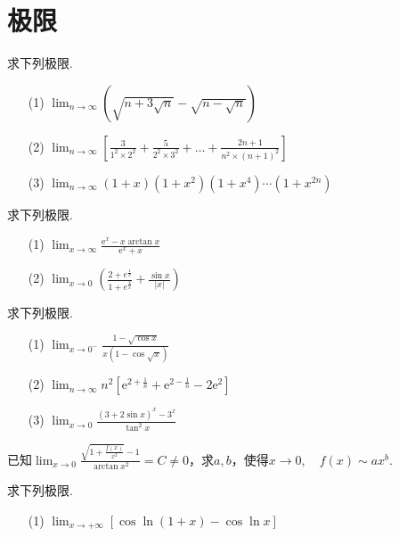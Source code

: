 \section{极限}
\begin{xiti}
\item 求下列极限.
\begin{enumerate}
	\item[(1)] $\lim _ { n \rightarrow \infty } ( \sqrt { n + 3 \sqrt { n } } - \sqrt { n - \sqrt { n } } )$
	\item[(2)] $\lim _ { n \rightarrow \infty } \left[ \frac { 3 } { 1 ^ { 2 } \times 2 ^ { 2 } } + \frac { 5 } { 2 ^ { 2 } \times 3 ^ { 2 } } + \dots + \frac { 2 n + 1 } { n ^ { 2 } \times ( n + 1 ) ^ { 2 } } \right]$
	\item[(3)] $\lim _ { n \rightarrow \infty } ( 1 + x ) \left( 1 + x ^ { 2 } \right) \left( 1 + x ^ { 4 } \right) \cdots \left( 1 + x ^ { 2 n } \right)$
\end{enumerate}
\item 求下列极限.
\begin{enumerate}
	\item[(1)] $\lim _ { x \rightarrow \infty } \frac { \mathrm { e } ^ { x } - x \arctan x } { \mathrm { e } ^ { x } + x }$
	\item[(2)] $\lim _ { x \rightarrow 0 } \left( \frac { 2 + e ^ { \frac { 1 } { x } } } { 1 + e ^ { \frac { 4 } { x } } } + \frac { \sin x } { | x | } \right)$
\end{enumerate}
\item 求下列极限.
\begin{enumerate}
	\item[(1)] $\lim _ { x \rightarrow 0 ^ { - } } \frac { 1 - \sqrt { \cos x } } { x ( 1 - \cos \sqrt { x } ) }$
	\item[(2)] $\lim _ { n \rightarrow \infty } n ^ { 2 } \left[ \mathrm { e } ^ { 2 + \frac { 1 } { n } } + \mathrm { e } ^ { 2 - \frac { 1 } { n } } - 2 \mathrm { e } ^ { 2 } \right]$
	\item[(3)] $\lim _ { x \rightarrow 0 } \frac { ( 3 + 2 \sin x ) ^ { x } - 3 ^ { x } } { \tan ^ { 2 } x }$
\end{enumerate}
\item 已知$\lim _ { x \rightarrow 0 } \frac { \sqrt { 1 + \frac { f ( x ) } { x ^ { 2 } } } - 1 } { \arctan x ^ { 2 } } = C \neq 0$，求$a,b$，使得$x \rightarrow 0 , \quad f ( x ) \sim a x ^ { b }$.
\item 求下列极限.
\begin{enumerate}
	\item[(1)] $\lim _ { x \rightarrow + \infty } [ \cos \ln ( 1 + x ) - \cos \ln x ]$

\end{enumerate}
\end{xiti}
